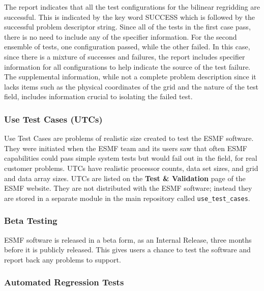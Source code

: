 The report indicates that all the test configurations for the bilinear regridding
are successful. This is indicated by the key word SUCCESS which is followed by the 
successful problem descriptor string. Since all of the tests in the first case pass,
there is no need to include any of the specifier information. For the second
ensemble of tests, one configuration passed, while the other failed. In this case,
since there is a mixture of successes and failures, the report includes 
specifier information for all configurations to help indicate the source of the
test failure. The supplemental information, while not a complete problem description
since it lacks items such as the physical coordinates of the grid and the nature of 
the test field, includes information crucial to isolating the failed test.


\subsubsection{Use Test Cases (UTCs)}

Use Test Cases are problems of realistic size created to test the ESMF
software.  They were initiated when the ESMF team and its users saw that
often ESMF capabilities could pass simple system tests but would fail
out in the field, for real customer problems.  UTCs have realistic
processor counts, data set sizes, and grid and data array sizes.  UTCs are
listed on the {\bf Test \& Validation} page of the ESMF website.  They
are not distributed with the ESMF software; instead they are stored in
a separate module in the main repository called {\tt use\_test\_cases}.

\subsubsection{Beta Testing}

ESMF software is released in a beta form, as an Internal Release,
three months before it is publicly released.  This gives users
a chance to test the software and report back any problems to 
support.

\subsubsection{Automated Regression Tests}


